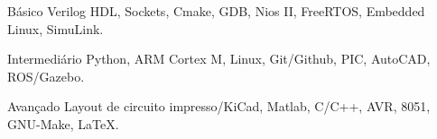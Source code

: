 

\begin{cvskills}

  \cvskill
    {Básico} %
    {Verilog HDL, Sockets, Cmake, GDB, Nios II, FreeRTOS, Embedded Linux, SimuLink.} %

  \cvskill
    {Intermediário} %
    {Python, ARM Cortex M, Linux, Git/Github, PIC, AutoCAD, ROS/Gazebo.} %

  \cvskill
    {Avançado} %
    {Layout de circuito impresso/KiCad, Matlab, C/C++, AVR, 8051, GNU-Make, LaTeX.} %

\end{cvskills}




